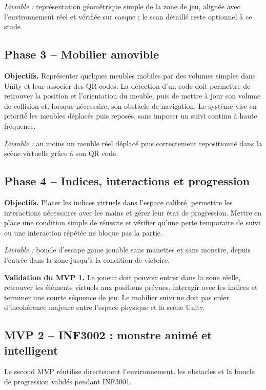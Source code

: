 \documentclass[11pt,a4paper]{article}
\begin{document}
\textit{Livrable :} représentation géométrique simple de la zone de jeu, alignée avec l'environnement réel et vérifiée sur casque ; le scan détaillé reste optionnel à ce stade.

\subsection*{Phase 3 -- Mobilier amovible}

\textbf{Objectifs.} Représenter quelques meubles mobiles par des volumes simples dans Unity et leur associer des QR codes. La détection d'un code doit permettre de retrouver la position et l'orientation du meuble, puis de mettre à jour son volume de collision et, lorsque nécessaire, son obstacle de navigation. Le système vise en priorité les meubles déplacés puis reposés, sans imposer un suivi continu à haute fréquence.

\textit{Livrable :} au moins un meuble réel déplacé puis correctement repositionné dans la scène virtuelle grâce à son QR code.

\subsection*{Phase 4 -- Indices, interactions et progression}

\textbf{Objectifs.} Placer les indices virtuels dans l'espace calibré, permettre les interactions nécessaires avec les mains et gérer leur état de progression. Mettre en place une condition simple de réussite et vérifier qu'une perte temporaire de suivi ou une interaction répétée ne bloque pas la partie.

\textit{Livrable :} boucle d'escape game jouable sans manettes et sans monstre, depuis l'entrée dans la zone jusqu'à la condition de victoire.

\textbf{Validation du MVP 1.} Le joueur doit pouvoir entrer dans la zone réelle, retrouver les éléments virtuels aux positions prévues, interagir avec les indices et terminer une courte séquence de jeu. Le mobilier suivi ne doit pas créer d'incohérence majeure entre l'espace physique et la scène Unity.

\subsection*{MVP 2 -- INF3002 : monstre animé et intelligent}

Le second MVP réutilise directement l'environnement, les obstacles et la boucle de progression validés pendant INF3001.
\end{document}
